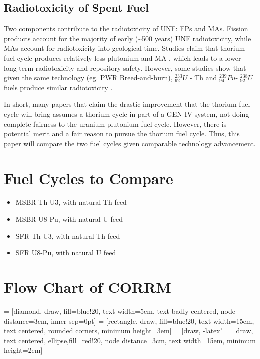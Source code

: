 \documentclass{article}
\newcommand{\uthree}{\xspace $^{233}_{92}U$ \xspace}
\newcommand{\ueight}{\xspace $^{238}_{92}U$\xspace}
\newcommand{\pu}{\xspace$^{239}_{94}Pu$\xspace}
\begin{document}
\subsection{Radiotoxicity of Spent Fuel}
Two components contribute to the radiotoxicity of 
\gls{UNF}: \glspl{FP} and \glspl{MA}.
Fission products account for the majority of early (\textasciitilde 500 years)
\gls{UNF} radiotoxicity, while \glspl{MA} account for 
radiotoxicity into geological time.
Studies claim that thorium fuel cycle produces relatively
less plutonium and \gls{MA} \cite{boczar_thorium_2002} \cite{david_revisiting_2007},
which leads to a lower long-term radiotoxicity and repository safety.
However, some studies show that given the same technology (eg. \gls{PWR} Breed-and-burn),
\uthree - Th and \pu - \ueight fuels produce similar radiotoxicity \cite{croff_comparative_2016}.

In short, many papers that claim the drastic improvement that the thorium
fuel cycle will bring assumes a thorium cycle in part of a GEN-IV system,
not doing complete fairness to the uranium-plutonium fuel cycle. However,
there is potential merit and a fair reason to pursue the thorium fuel cycle.
Thus, this paper will compare the two fuel cycles given comparable technology
advancement. 




%

\section{Fuel Cycles to Compare}
\begin{itemize}
\item MSBR Th-U3, with natural Th feed \cite{robertson_conceptual_1971}
\item MSBR U8-Pu, with natural U feed
\item SFR Th-U3, with natural Th feed
\item SFR U8-Pu, with natural U feed
\end{itemize}


\section{Flow Chart of \gls{CORRM}}

 = [diamond, draw, fill=blue!20, 
    text width=5em, text badly centered, node distance=3cm, inner sep=0pt]
 = [rectangle, draw, fill=blue!20, 
    text width=15em, text centered, rounded corners, minimum height=3em]
 = [draw, -latex']
 = [draw, text centered, ellipse,fill=red!20, node distance=3cm, text width=15em,
    minimum height=2em]
    
\end{document}
